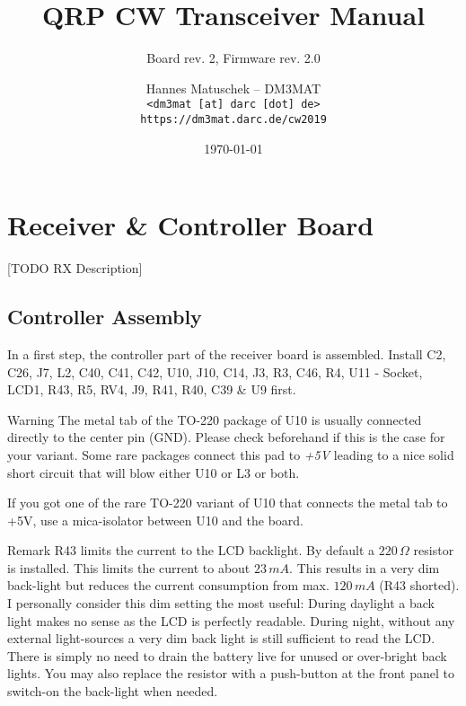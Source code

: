 \documentclass[10pt, a4paper]{scrartcl}
\title{QRP CW Transceiver Manual}
\subtitle{Board rev. 2, Firmware rev. 2.0}
\author{Hannes Matuschek -- DM3MAT\\\texttt{<dm3mat [at] darc [dot] de>}\\\texttt{https://dm3mat.darc.de/cw2019}}
\date{\today}
\newenvironment{remark}{\begin{bclogo}[couleur=blue!30,arrondi=.1,logo=\bcinfo,ombre=true]{Remark}}{\end{bclogo}}
\newenvironment{warning}{\begin{bclogo}[couleur=red!30,arrondi=.1,logo=\bcattention,ombre=true]{Warning}}{\end{bclogo}}
\begin{document}
\maketitle
\begin{abstract}
\end{abstract}

\setcounter{tocdepth}{2}
\tableofcontents
\thispagestyle{empty}

\clearpage
\section{Receiver \& Controller Board} \label{sec:rx}
 [TODO RX Description]

\subsection{Controller Assembly}
 In a first step, the controller part of the receiver board is assembled. Install C2, C26, J7, L2, C40, C41, C42, U10, J10, C14, J3, R3, C46, R4, U11 - Socket, LCD1, R43, R5, RV4, J9, R41, R40, C39 \& U9 first. 

\begin{warning}
The metal tab of the TO-220 package of U10 is usually connected directly to the center pin (GND). Please check beforehand if this is the case for your variant. Some rare packages connect this pad to \emph{+5V} leading to a nice solid short circuit that will blow either U10 or L3 or both.
\end{warning}

If you got one of the rare TO-220 variant of U10 that connects the metal tab to +5V, use a mica-isolator between U10 and the board.


\begin{remark}
 R43 limits the current to the LCD backlight. By default a $220\,\Omega$ resistor is installed. This limits the current to about $23\,mA$. This results in a very dim back-light but reduces the current consumption from max. $120\, mA$ (R43 shorted). I personally consider this dim setting the most useful: During daylight a back light makes no sense as the LCD is perfectly readable. During night, without any external light-sources a very dim back light is still sufficient to read the LCD. There is simply no need to drain the battery live for unused or over-bright back lights. You may also replace the resistor with a push-button at the front panel to switch-on the back-light when needed.
\end{remark}
 
\end{document}
